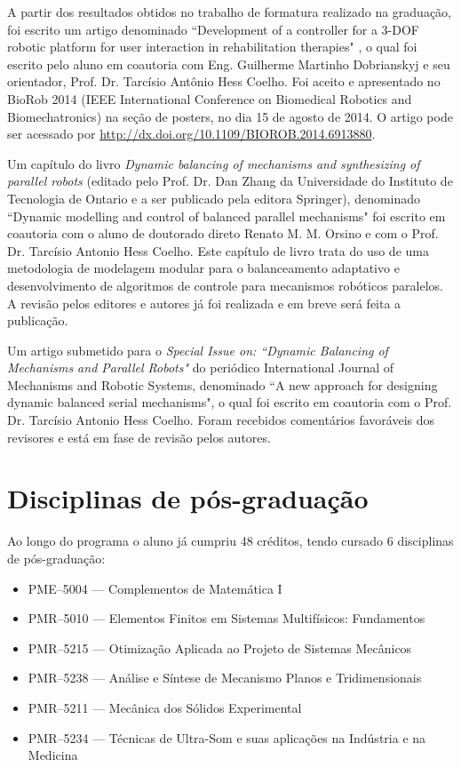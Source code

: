 \documentclass[a4paper,11pt,brazil,fleqn]{article}
\begin{document}
A partir dos resultados obtidos no trabalho de formatura realizado na gradua\c{c}\~ao, foi escrito um artigo denominado
``Development of a controller for a 3-DOF robotic platform for user interaction in rehabilitation therapies" \cite{Andre2}, o qual foi escrito pelo aluno em coautoria com Eng. Guilherme Martinho Dobrianskyj e seu orientador, Prof. Dr. Tarc\'isio Ant\^onio Hess Coelho. Foi aceito e apresentado no BioRob 2014 (IEEE International Conference on Biomedical Robotics and Biomechatronics) na se\c{c}\~ao de posters, no dia 15 de agosto de 2014. O artigo pode ser acessado por \url{http://dx.doi.org/10.1109/BIOROB.2014.6913880}.

Um cap\' itulo do livro {\em Dynamic balancing of mechanisms and synthesizing of parallel
robots}  (editado pelo Prof. Dr. Dan Zhang da Universidade do Instituto de Tecnologia
de Ontario e a ser publicado pela editora Springer), denominado ``Dynamic modelling
and control of balanced parallel mechanisms" foi escrito em coautoria com o aluno de
doutorado direto Renato M. M. Orsino e com o Prof. Dr. Tarc\'isio Antonio Hess Coelho.
Este cap\'itulo de livro trata do uso de uma metodologia de modelagem modular para o
balanceamento adaptativo e desenvolvimento de algoritmos de controle para mecanismos
rob\'oticos paralelos. A revis\~ao pelos editores e autores j\'a foi realizada e em breve ser\'a feita a publica\c{c}\~ao.

Um artigo submetido para o {\em  Special Issue on: ``Dynamic Balancing of Mechanisms and Parallel Robots" } do peri\'odico International Journal of Mechanisms and Robotic Systems, denominado ``A new approach for designing dynamic balanced serial mechanisms", o qual foi escrito em coautoria com o Prof. Dr. Tarc\'isio Antonio Hess Coelho. Foram recebidos coment\'arios favor\'aveis dos revisores e est\'a em fase de revis\~ao pelos autores.

\section{Disciplinas de p\'os-gradua\c{c}\~ao}\label{S06}

Ao longo do programa o aluno j\'a cumpriu 48 cr\'editos, tendo cursado 6 disciplinas 
de p\'os-gradua\c{c}\~ao:
\begin{itemize}
\item PME--5004 --- Complementos de Matem\'atica I
\item PMR--5010 --- Elementos Finitos em Sistemas Multif\'isicos: Fundamentos
\item PMR--5215 --- Otimiza\c{c}\~ao Aplicada ao Projeto de Sistemas Mec\^anicos
\item PMR--5238 --- An\'alise e S\'intese de Mecanismo Planos e Tridimensionais
\item PMR--5211 --- Mec\^anica dos S\'olidos Experimental
\item PMR--5234 --- T\'ecnicas de Ultra-Som e suas aplica\c{c}\~oes na Ind\'ustria e na Medicina
\end{itemize}
\end{document}
